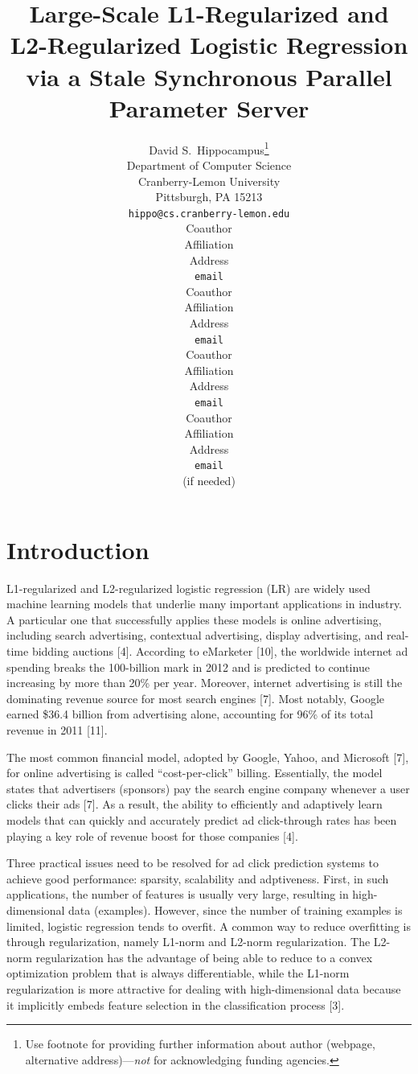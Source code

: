 \documentclass{article} %
\title{Large-Scale L1-Regularized and L2-Regularized Logistic Regression via a Stale Synchronous Parallel Parameter Server}
\author{
David S.~Hippocampus\thanks{ Use footnote for providing further information
about author (webpage, alternative address)---\emph{not} for acknowledging
funding agencies.} \\
Department of Computer Science\\
Cranberry-Lemon University\\
Pittsburgh, PA 15213 \\
\texttt{hippo@cs.cranberry-lemon.edu} \\
\And
Coauthor \\
Affiliation \\
Address \\
\texttt{email} \\
\AND
Coauthor \\
Affiliation \\
Address \\
\texttt{email} \\
\And
Coauthor \\
Affiliation \\
Address \\
\texttt{email} \\
\And
Coauthor \\
Affiliation \\
Address \\
\texttt{email} \\
(if needed)\\
}
\begin{document}
\maketitle

\begin{abstract}

\end{abstract}

\section{Introduction}

L1-regularized and L2-regularized logistic regression (LR) are widely used machine learning models that underlie many important applications in industry. A particular one that successfully applies these models is online advertising, including search advertising, contextual advertising, display advertising, and real-time bidding auctions [4]. According to eMarketer [10], the worldwide internet ad spending breaks the 100-billion mark in 2012 and is predicted to continue increasing by more than 20\% per year. Moreover, internet advertising is still the dominating revenue source for most search engines [7]. Most notably, Google earned \$36.4 billion from advertising alone, accounting for 96\% of its total revenue in 2011 [11].

The most common financial model, adopted by Google, Yahoo, and Microsoft [7], for online advertising is called “cost-per-click” billing. Essentially, the model states that advertisers (sponsors) pay the search engine company whenever a user clicks their ads [7]. As a result, the ability to efficiently and adaptively learn models that can quickly and accurately predict ad click-through rates has been playing a key role of revenue boost for those companies [4].

Three practical issues need to be resolved for ad click prediction systems to achieve good performance: sparsity, scalability and adptiveness. First, in such applications, the number of features is usually very large, resulting in high-dimensional data (examples). However, since the number of training examples is limited, logistic regression tends to overfit. A common way to reduce overfitting is through regularization, namely L1-norm and L2-norm regularization. The L2-norm regularization has the advantage of being able to reduce to a convex optimization problem that is always differentiable, while the L1-norm regularization is more attractive for dealing with high-dimensional data because it implicitly embeds feature selection in the classification process [3].
\end{document}
